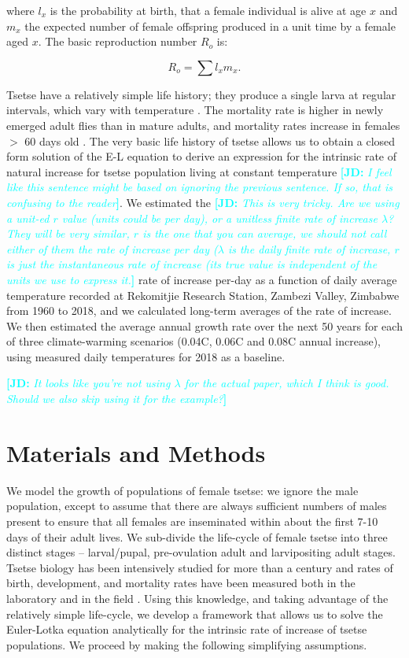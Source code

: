\documentclass[12pt,a4paper]{article}
\newcommand{\comment}[3]{\textcolor{#1}{\textbf{[#2: }\textsl{#3}\textbf{]}}}
\newcommand{\jd}[1]{\comment{cyan}{JD}{#1}}
\begin{document}
where  $l_{x}$ is the probability at birth, that a female individual is alive at age $x$ and $m_{x}$ the expected number of female offspring produced in a unit time by a female aged $x$.
The basic reproduction number $R_{o}$ is:

\begin{equation}
\label{equation4}
R_{o}= \sum l_{x}m_{x}. 
\end{equation}

Tsetse have a relatively simple life history; they produce a single larva at regular intervals, which vary with temperature \cite{hargrove2003tsetse}. The mortality rate is higher in newly emerged adult flies than in mature adults, and mortality rates increase in females $>$ 60 days old \cite{hargrove2020model}.   The very basic life history of tsetse allows us to obtain a closed form solution of the E-L equation to derive an expression for the intrinsic rate of natural increase for tsetse population living at constant temperature \jd{I feel like this sentence might be based on ignoring the previous sentence. If so, that is confusing to the reader}. We estimated the \jd{This is very tricky. Are we using a unit-ed $r$ value (units could be per day), or a unitless finite rate of increase $\lambda$? They will be very similar, $r$ is the one that you can average, we should not call either of them the rate of increase per day ($\lambda$ is the daily finite rate of increase, $r$ is just the instantaneous rate of increase (its true value is independent of the units we use to express it.} rate of increase per-day as a function of daily average temperature recorded at Rekomitjie Research Station, Zambezi Valley, Zimbabwe from 1960 to 2018, and we calculated long-term averages of the rate of increase. We then estimated the average annual growth rate over the next 50 years for each of three climate-warming scenarios (0.04\textdegree C, 0.06\textdegree C and 0.08\textdegree C annual increase), using measured daily temperatures for 2018 as a baseline. 

\jd{It looks like you're not using $\lambda$ for the actual paper, which I think is good. Should we also skip using it for the example?}

\section*{Materials and Methods}
We model the growth of populations of female tsetse: we ignore the male population, except to assume that there are always sufficient numbers of males present to ensure that all females are inseminated within about the first 7-10 days of their adult lives. We sub-divide the life-cycle of female tsetse into three distinct stages – larval/pupal, pre-ovulation adult and larvipositing adult stages. Tsetse biology has been intensively studied for more than a century and rates of birth, development, and mortality rates have been measured both  in  the laboratory and  in the field \cite{Rogers2011,Hargrove2004a,Jarry2007,Hargrove2011,Hargrove2019a}. Using this knowledge, and taking advantage of the relatively simple life-cycle, we develop a framework that allows us to solve the Euler-Lotka equation analytically for the intrinsic rate of increase of tsetse populations. We proceed by making the following simplifying assumptions.
\end{document}
